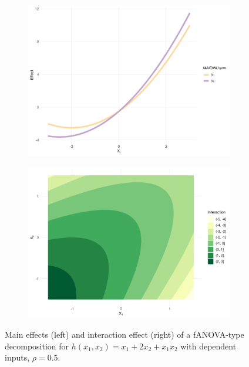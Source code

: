 \begin{figure}[htpb]
    \centering
    \begin{subfigure}[t]{0.49\textwidth}
        \centering
        \includegraphics[width=\textwidth]{images/experiment_section/hoeffding_rho05_main.png}
    \end{subfigure}%
    \hfill
    \begin{subfigure}[t]{0.49\textwidth}
        \centering
        \includegraphics[width=\textwidth]{images/experiment_section/hoeffding_rho05_interaction.png}
    \end{subfigure}
    \caption{Main effects (left) and interaction effect (right) of a fANOVA-type decomposition for $h(x_1, x_2) = x_1 + 2 x_2 + x_1 x_2$ with dependent inputs, $\rho = 0.5$.}
    \label{fig:hoeffding_rho05}
\end{figure}

